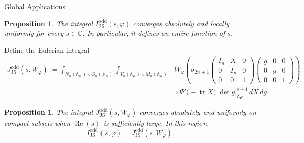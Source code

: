 \documentclass[12pt,reqno]{amsart}
\numberwithin{equation}{section}%
\numberwithin{equation}{subsection}
\newtheorem{prop}[equation]{Proposition}
\theoremstyle{definition}
\theoremstyle{remark}
\begin{document}
\begin{section}{Global Applications}
\begin{prop}\label{prop:global-js-odd-analytic}
The integral \(I_{\mathrm{JS}}^{\mathrm{odd}}(s,\varphi)\)
converges absolutely and locally uniformly for every
\(s\in\mathbb{C}\). In particular, it defines an entire function
of \(s\).
\end{prop}

Define the Eulerian integral
\[
\begin{split}
  J_{\mathrm{JS}}^{\mathrm{odd}}(s,W_\varphi)
  :=
  \int_{N_n(\mathbb{A}_K)\backslash G_n(\mathbb{A}_K)}
  \int_{V_n(\mathbb{A}_K)\backslash M_n(\mathbb{A}_K)}
  &W_\varphi\left(
    \sigma_{2n+1}
    \begin{pmatrix}
      I_n & X   & 0\\
      0   & I_n & 0\\
      0   & 0   & 1
    \end{pmatrix}
    \begin{pmatrix}
      g & 0 & 0\\
      0 & g & 0\\
      0 & 0 & 1
    \end{pmatrix}
  \right)                                                     \\
  &\times
  \Psi'\bigl(-\operatorname{tr}X\bigr)
  |\det g|_{\mathbb{A}_K}^{s-1}\,dX\,dg.
\end{split}
\]

\begin{prop}\label{prop:global-js-odd-unfolding}
The integral
\(J_{\mathrm{JS}}^{\mathrm{odd}}(s,W_\varphi)\)
converges absolutely and uniformly on compact subsets when
\(\operatorname{Re}(s)\) is sufficiently large. In this region,
\[
  I_{\mathrm{JS}}^{\mathrm{odd}}(s,\varphi)
  =
  J_{\mathrm{JS}}^{\mathrm{odd}}(s,W_\varphi).
\]
\end{prop}


\end{section}
\end{document}
